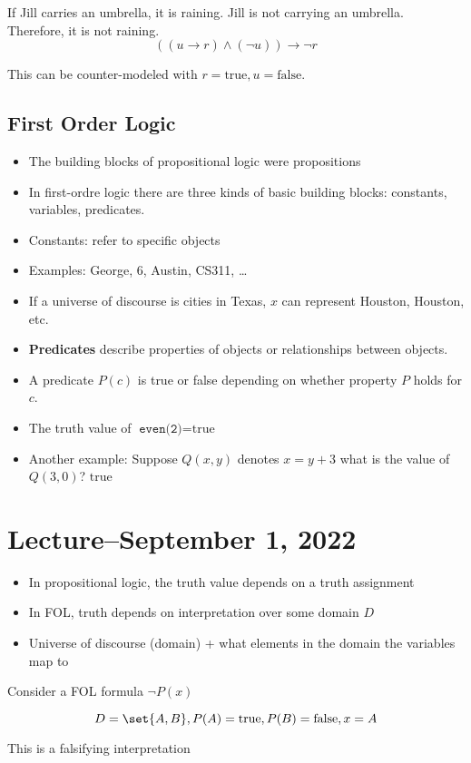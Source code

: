 \documentclass{scrreprt}
\newcommand{\true}{\text{true}}
\newcommand{\false}{\text{false}}
\begin{document}
\begin{example}
	If Jill carries an umbrella, it is raining. Jill is not carrying an umbrella. Therefore, it is not raining.
	\[
		((u\rightarrow r)\land (\neg u))\rightarrow \neg r
	\]

	This can be counter-modeled with $r=\true, u=\false$.
\end{example}

\subsection{First Order Logic}
\begin{itemize}
	\item The building blocks of propositional logic were propositions
	\item In first-ordre logic there are three kinds of basic building blocks:
	      constants, variables, predicates.
	\item Constants: refer to specific objects
	\item Examples: George, 6, Austin, CS311, \ldots
	\item If a universe of discourse is cities in Texas, $x$ can represent Houston,
	      Houston, etc.
	\item \textbf{Predicates} describe properties of objects or relationships between objects.
	\item A predicate $P(c)$ is true or false depending on whether property
	      $P$ holds for $c$.
	\item The truth value of $\texttt{even(2)} = \true$
	\item Another example: Suppose $Q(x, y)$ denotes $x=y+3$ what is the value of
	      $Q(3, 0)$? $\true$
\end{itemize}

\section{Lecture--September 1, 2022}
\begin{itemize}
	\item In propositional logic, the truth value depends on a truth assignment
	\item In FOL, truth depends on interpretation over some domain $D$
	\item Universe of discourse (domain) + what elements in the domain the variables map to
\end{itemize}

\begin{example}
	Consider a FOL formula $\neg P(x)$

	\[D=\set{A, B}, P(A)=\true, P(B)=\false, x=A\]

	This is a falsifying interpretation
\end{example}
\end{document}

